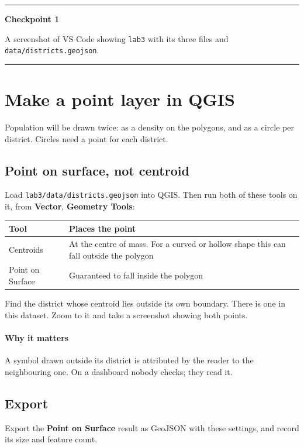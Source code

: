 \documentclass{article}
\newcommand{\cd}[1]{\texttt{#1}}
\newenvironment{keypoint}[1]
  {\par\vspace{.7em}\noindent\rule{\linewidth}{.6pt}\par\vspace{.15em}
   \noindent\textbf{#1}\par\nobreak\vspace{-.3em}}
  {\par\vspace{.15em}\noindent\rule{\linewidth}{.6pt}\par\vspace{.7em}}
\begin{document}
\begin{keypoint}{Checkpoint 1}
A screenshot of VS Code showing \cd{lab3} with its three files and
\cd{data/districts.geojson}.
\end{keypoint}


\section{Make a point layer in QGIS}

Population will be drawn twice: as a density on the polygons, and as a
circle per district. Circles need a point for each district.

\subsection{Point on surface, not centroid}

Load \cd{lab3/data/districts.geojson} into QGIS. Then run both of these
tools on it, from \textbf{Vector}, \textbf{Geometry Tools}:

\begin{tabularx}{\textwidth}{@{}L{3.6cm} X@{}}
\toprule
\textbf{Tool} & \textbf{Places the point} \\
\midrule
Centroids         & At the centre of mass. For a curved or hollow shape
                    this can fall outside the polygon \\
Point on Surface  & Guaranteed to fall inside the polygon \\
\bottomrule
\end{tabularx}

\vspace{.8em}
Find the district whose centroid lies outside its own boundary. There is
one in this dataset. Zoom to it and take a screenshot showing both
points.

\paragraph{Why it matters}
A symbol drawn outside its district is attributed by the reader to the
neighbouring one. On a dashboard nobody checks; they read it.

\subsection{Export}

Export the \textbf{Point on Surface} result as GeoJSON with these
settings, and record its size and feature count.
\end{document}
